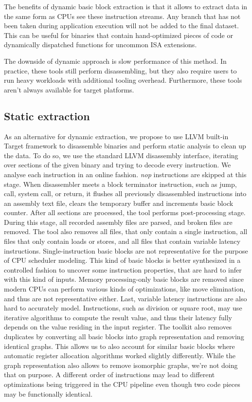 The benefits of dynamic basic block extraction is that it allows to extract data in the same form as CPUs see these instruction streams. Any branch that has not been taken during application execution will not be added to the final dataset. This can be useful for binaries that contain hand-optimized pieces of code or dynamically dispatched functions for uncommon ISA extensions.

The downside of dynamic approach is slow performance of this method. In practice, these tools still perform disassembling, but they also require users to run heavy workloads with additional tooling overhead. Furthermore, these tools aren't always available for target platforms.

\subsection{Static extraction}

As an alternative for dynamic extraction, we propose to use LLVM built-in Target framework to disassemble binaries and perform static analysis to clean up the data. To do so, we use the standard LLVM disassembly interface, iterating over sections of the given binary and trying to decode every instruction. We analyse each instruction in an online fashion. \textit{nop} instructions are skipped at this stage. When disassembler meets a block terminator instruction, such as jump, call, system call, or return, it flushes all previously disassembled instructions into an assembly text file, clears the temporary buffer and increments basic block counter. After all sections are processed, the tool performs post-processing stage. During this stage, all recorded assembly files are parsed, and broken files are removed. The tool also removes all files, that only contain a single instruction, all files that only contain loads or stores, and all files that contain variable latency instructions. Single-instruction basic blocks are not representative for the purpose of CPU scheduler modeling. This kind of basic blocks is better synthesized in a controlled fashion to uncover some instruction properties, that are hard to infer with this kind of inputs. Memory processing-only basic blocks are removed since modern CPUs can perform various kinds of optimizations, like move elimination\cite{Intel64IA322022}, and thus are not representative either. Last, variable latency instructions are also hard to accurately model. Instructions, such as division or square root, may use iterative algorithms to compute the result value, and thus their latency fully depends on the value residing in the input register. The toolkit also removes duplicates by converting all basic blocks into graph representation and removing identical graphs. This allows us to also account for similar basic blocks where automatic register allocation algorithms worked slightly differently. While the graph representation also allows to remove isomorphic graphs, we're not doing that on purpose. A different order of instructions may lead to different optimizations being triggered in the CPU pipeline even though two code pieces may be functionally identical.

